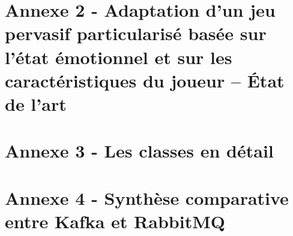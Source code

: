 \documentclass{article}
\begin{document}
\section{Annexe 2 - Adaptation d’un jeu pervasif particularisé basée sur l'état émotionnel et sur les caractéristiques du joueur – État de l’art}\label{ann:eda}
	

\section{Annexe 3 - Les classes en détail}\label{ann:detailclasse}

\section{Annexe 4 - Synthèse comparative entre Kafka et RabbitMQ}%
		



\end{document}
